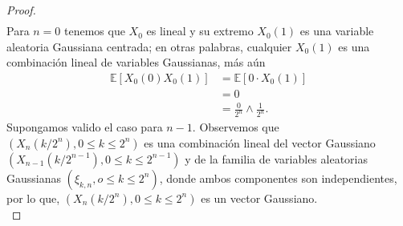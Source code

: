 \begin{proof}
\begin{align}
	\end{align}
Para $n = 0$ tenemos que $X_0$ es lineal y su extremo $X_0(1)$ es una variable aleatoria Gaussiana centrada; en otras palabras, cualquier $X_0(1)$ es una combinación lineal de variables Gaussianas, más aún
	\begin{align*}
		\mathbb{E} \left[ X_0 (0) X_0 (1) \right] & = \mathbb{E} \left[ 0 \cdot X_0 (1) \right] \\
		& = 0 \\
		& = \frac{0}{2^n} \wedge \frac{1}{2^n}.
	\end{align*}
Supongamos valido el caso para $n - 1$. Observemos que $(X_n (k / 2^n), 0 \leq k \leq 2^n)$ es una combinación lineal del vector Gaussiano $(X_{n-1} (k / 2^{n-1}), 0 \leq k \leq 2^{n-1})$ y de la familia de variables aleatorias Gaussianas $(\xi_{k, n}, o \leq k \leq 2^n)$, donde ambos componentes son independientes, por lo que, $(X_n (k / 2^n), 0 \leq k \leq 2^n)$  es un vector Gaussiano. \\


\end{proof}
